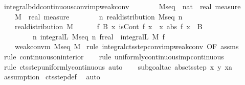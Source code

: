 \documentclass[leqno]{article}
\theoremstyle{definition}
\begin{document}
\begin{isabellebody}
\isamarkupfalse%
\ integral{\isacharunderscore}bdd{\isacharunderscore}continuous{\isacharunderscore}conv{\isacharunderscore}imp{\isacharunderscore}weak{\isacharunderscore}conv{\isacharcolon}\isanewline
\ \ \ \isanewline
\ \ \ \ M{\isacharunderscore}seq\ {\isacharcolon}{\isacharcolon}\ {\isachardoublequoteopen}nat\ {\isasymRightarrow}\ real\ measure{\isachardoublequoteclose}\ \isanewline
\ \ \ \ M\ {\isacharcolon}{\isacharcolon}\ {\isachardoublequoteopen}real\ measure{\isachardoublequoteclose}\isanewline
\ \ \ \isanewline
\ \ \ \ {\isachardoublequoteopen}{\isasymAnd}n{\isachardot}\ real{\isacharunderscore}distribution\ {\isacharparenleft}M{\isacharunderscore}seq\ n{\isacharparenright}{\isachardoublequoteclose}\ \ \isanewline
\ \ \ \ {\isachardoublequoteopen}real{\isacharunderscore}distribution\ M{\isachardoublequoteclose}\ \ \isanewline
\ \ \ \ {\isachardoublequoteopen}{\isasymAnd}f\ B{\isachardot}\ {\isacharparenleft}{\isasymAnd}x{\isachardot}\ isCont\ f\ x{\isacharparenright}\ {\isasymLongrightarrow}\ {\isacharparenleft}{\isasymAnd}x{\isachardot}\ abs\ {\isacharparenleft}f\ x{\isacharparenright}\ {\isasymle}\ B{\isacharparenright}\ {\isasymLongrightarrow}\isanewline
\ \ \ \ \ \ \ \ \ {\isacharparenleft}{\isasymlambda}n{\isachardot}\ integral\isactrlsup L\ {\isacharparenleft}M{\isacharunderscore}seq\ n{\isacharparenright}\ f{\isacharcolon}{\isacharcolon}real{\isacharparenright}\ {\isacharminus}{\isacharminus}{\isacharminus}{\isacharminus}{\isachargreater}\ integral\isactrlsup L\ M\ f{\isachardoublequoteclose}\isanewline
\ \ \ \isanewline
\ \ \ \ {\isachardoublequoteopen}weak{\isacharunderscore}conv{\isacharunderscore}m\ M{\isacharunderscore}seq\ M{\isachardoublequoteclose}\isanewline
{}\isamarkupfalse%
\ {\isacharparenleft}rule\ integral{\isacharunderscore}cts{\isacharunderscore}step{\isacharunderscore}conv{\isacharunderscore}imp{\isacharunderscore}weak{\isacharunderscore}conv\ {\isacharbrackleft}OF\ assms{\isacharbrackright}{\isacharparenright}\isanewline
\ \ \isamarkupfalse%
\ {\isacharparenleft}rule\ continuous{\isacharunderscore}on{\isacharunderscore}interior{\isacharparenright}\isanewline
\ \ \isamarkupfalse%
\ {\isacharparenleft}rule\ uniformly{\isacharunderscore}continuous{\isacharunderscore}imp{\isacharunderscore}continuous{\isacharparenright}\isanewline
\ \ \isamarkupfalse%
\ {\isacharparenleft}rule\ cts{\isacharunderscore}step{\isacharunderscore}uniformly{\isacharunderscore}continuous{\isacharcomma}\ auto{\isacharparenright}\isanewline
\ \ \isamarkupfalse%
\ {\isacharparenleft}subgoal{\isacharunderscore}tac\ {\isachardoublequoteopen}abs{\isacharparenleft}cts{\isacharunderscore}step\ x\ y\ xa{\isacharparenright}\ {\isasymle}\ {}{\isachardoublequoteclose}{\isacharparenright}\isanewline
\ \ \isamarkupfalse%
\ assumption\isanewline
{}\isamarkupfalse%
\ cts{\isacharunderscore}step{\isacharunderscore}def\ \isamarkupfalse%
\ auto%
\end{isabellebody}
\end{document}
